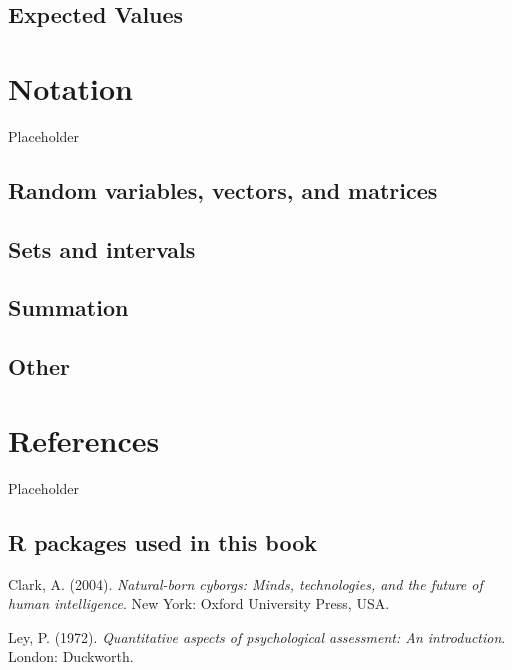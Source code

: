 \documentclass[
]{book}
\begin{document}
\hypertarget{expected-values}{%
\section{Expected Values}\label{expected-values}}

\hypertarget{notation}{%
\chapter*{Notation}\label{notation}}

Placeholder

\hypertarget{random-variables-vectors-and-matrices}{%
\section{Random variables, vectors, and matrices}\label{random-variables-vectors-and-matrices}}

\hypertarget{sets-and-intervals}{%
\section{Sets and intervals}\label{sets-and-intervals}}

\hypertarget{summation}{%
\section{Summation}\label{summation}}

\hypertarget{other}{%
\section{Other}\label{other}}

\hypertarget{references}{%
\chapter*{References}\label{references}}

Placeholder

\hypertarget{r-packages-used-in-this-book}{%
\section*{R packages used in this book}\label{r-packages-used-in-this-book}}

\hypertarget{refs}{}
\leavevmode\hypertarget{ref-clark2004natural}{}%
Clark, A. (2004). \emph{Natural-born cyborgs: Minds, technologies, and the future of human intelligence}. New York: Oxford University Press, USA.

\leavevmode\hypertarget{ref-ley1972quantitative}{}%
Ley, P. (1972). \emph{Quantitative aspects of psychological assessment: An introduction}. London: Duckworth.
\end{document}
